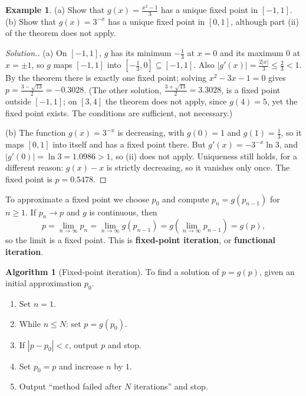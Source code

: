 \documentclass[11pt,a4paper]{article}
\numberwithin{equation}{section}
\theoremstyle{definition}
\newtheorem{exa}[thm]{Example}
\newtheorem{alg}[thm]{Algorithm}
\newenvironment{solution}
  {\renewcommand{\qedsymbol}{}\begin{proof}[\textit{Solution}.]}
  {\end{proof}}
\begin{document}
\begin{exa}
\label{exa:fpexist}
(a) Show that $g(x) = \frac{x^2-1}{3}$ has a unique fixed point in $[-1,1]$. (b) Show that $g(x) = 3^{-x}$ has a unique fixed point in
$[0,1]$, although part (ii) of the theorem does not apply.
\end{exa}

\begin{solution}
(a) On $[-1,1]$, $g$ has its minimum $-\frac13$ at $x = 0$ and its maximum $0$ at $x = \pm1$, so $g$ maps $[-1,1]$ into
$\left[-\frac13,0\right]\subseteq[-1,1]$. Also $|g'(x)| = \frac{2|x|}{3}\leq\frac23<1$. By the theorem there is exactly one fixed point; solving
$x^2-3x-1 = 0$ gives $p = \frac{3-\sqrt{13}}{2} = -0.3028$. (The other solution, $\frac{3+\sqrt{13}}2 = 3.3028$, is a fixed point outside
$[-1,1]$; on $[3,4]$ the theorem does not apply, since $g(4) = 5$, yet the fixed point exists. The conditions are sufficient, not
necessary.)

(b) The function $g(x) = 3^{-x}$ is decreasing, with $g(0) = 1$ and $g(1) = \frac13$, so it maps $[0,1]$ into itself and has a fixed point
there. But $g'(x) = -3^{-x}\ln3$, and $|g'(0)| = \ln 3 = 1.0986>1$, so (ii) does not apply. Uniqueness still holds, for a different reason:
$g(x)-x$ is strictly decreasing, so it vanishes only once. The fixed point is $p = 0.5478$.
\end{solution}

To approximate a fixed point we choose $p_0$ and compute $p_n = g(p_{n-1})$ for $n\geq1$. If $p_n\longrightarrow p$ and $g$ is continuous,
then
$$p = \lim_{n\rightarrow\infty}p_n = \lim_{n\rightarrow\infty}g(p_{n-1}) = g\left(\lim_{n\rightarrow\infty}p_{n-1}\right) = g(p),$$
so the limit is a fixed point. This is \textbf{fixed-point iteration}, or \textbf{functional iteration}.

\begin{alg}[Fixed-point iteration]
\label{alg:fixedpoint}
To find a solution of $p = g(p)$, given an initial approximation $p_0$.
\begin{enumerate}[label=Step \arabic*:,leftmargin=*]
\item Set $n = 1$.
\item While $n\leq N$: set $p = g(p_0)$.
\item If $|p-p_0|<\varepsilon$, output $p$ and stop.
\item Set $p_0 = p$ and increase $n$ by $1$.
\item Output ``method failed after $N$ iterations'' and stop.
\end{enumerate}
\end{alg}
\end{document}
